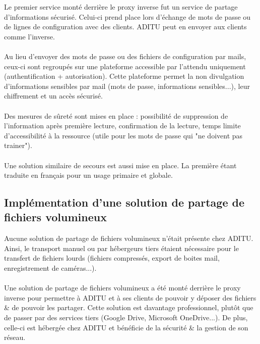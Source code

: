 Le premier service monté derrière le proxy inverse fut un service de partage d'informations sécurisé. Celui-ci prend place lors d'échange de mots de passe ou de lignes de configuration avec des clients. ADITU peut en envoyer aux clients comme l'inverse.
\\ \\
Au lieu d'envoyer des mots de passe ou des fichiers de configuration par mails, ceux-ci sont regroupés sur une plateforme accessible par l'attendu uniquement (authentification + autorisation). Cette plateforme permet la non divulgation d'informations sensibles par mail (mots de passe, informations sensibles...), leur chiffrement et un accès sécurisé.
\\ \\
Des mesures de sûreté sont mises en place : possibilité de suppression de l'information après première lecture, confirmation de la lecture, temps limite d'accessibilité à la ressource (utile pour les mots de passe qui "ne doivent pas trainer").
\\ \\
Une solution similaire de secours est aussi mise en place. La première étant traduite en français pour un usage primaire et globale.



\subsection{Implémentation d'une solution de partage de fichiers volumineux}

Aucune solution de partage de fichiers volumineux n'était présente chez ADITU. Ainsi, le transport manuel ou par hébergeurs tiers étaient nécessaire pour le transfert de fichiers lourds (fichiers compressés, export de boites mail, enregistrement de caméras...).
\\ \\
Une solution de partage de fichiers volumineux a été monté derrière le proxy inverse pour permettre à ADITU et à ses clients de pouvoir y déposer des fichiers \& de pouvoir les partager. Cette solution est davantage professionnel, plutôt que de passer par des services tiers (Google Drive, Microsoft OneDrive...). De plus, celle-ci est hébergée chez ADITU et bénéficie de la sécurité \& la gestion de son réseau.


